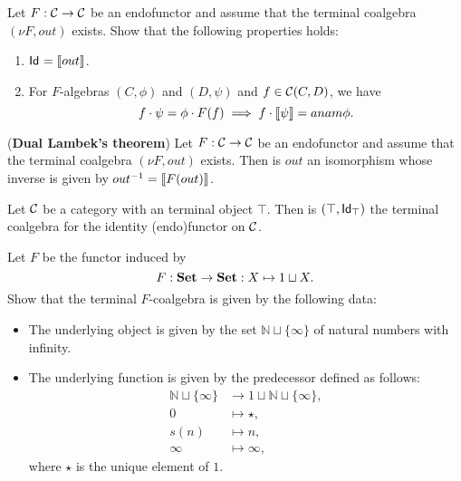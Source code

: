 \begin{exer} Let $F:\CC\to\CC$ be an endofunctor and assume that the terminal coalgebra $(\nu F, out)$ exists. Show that the following properties holds:
\begin{enumerate}
\item $\Id = \anam{out}$.
\item For $F$-algebras $(C,\phi)$ and $(D,\psi)$ and $f\in\CHom{\CC}{C}{D}$, we have 
\[
f\Comp\psi  = \phi\Comp F(f) \implies f\Comp\anam{\psi} = anam{\phi}.
\]
\end{enumerate} 
\end{exer}

\begin{exer} (\textbf{Dual Lambek's theorem}) Let $F:\CC\to\CC$ be an endofunctor and assume that the terminal coalgebra $(\nu F, out)$ exists. Then is $out$ an isomorphism whose inverse is given by $\Inv{out} = \anam{F(out)}$.
\end{exer}

\begin{exer}\label{exer:terminalalg_for_idfun_with_terminalob} Let $\CC$ be a category with an terminal object $\top$. Then is $(\top, \Id[\top])$ the terminal coalgebra for the identity (endo)functor on $\CC$.
\end{exer}

\begin{exer} Let $F$ be the functor induced by 
\[
F:\SET\to\SET : X\mapsto 1 \sqcup X.
\]
Show that the terminal $F$-coalgebra is given by the following data:
\begin{itemize}
\item The underlying object is given by the set $\mathbb{N} \sqcup \{\infty\}$ of natural numbers with infinity.
\item The underlying function is given by the predecessor defined as follows: 
\begin{align*}
\mathbb{N} \sqcup \{\infty\} &\to 1 \sqcup \mathbb{N} \sqcup \{\infty\},\\
0 &\mapsto \star,\\
s(n) &\mapsto n,\\
\infty &\mapsto \infty,
\end{align*}
where $\star$ is the unique element of $1$.
\end{itemize}
\end{exer}



